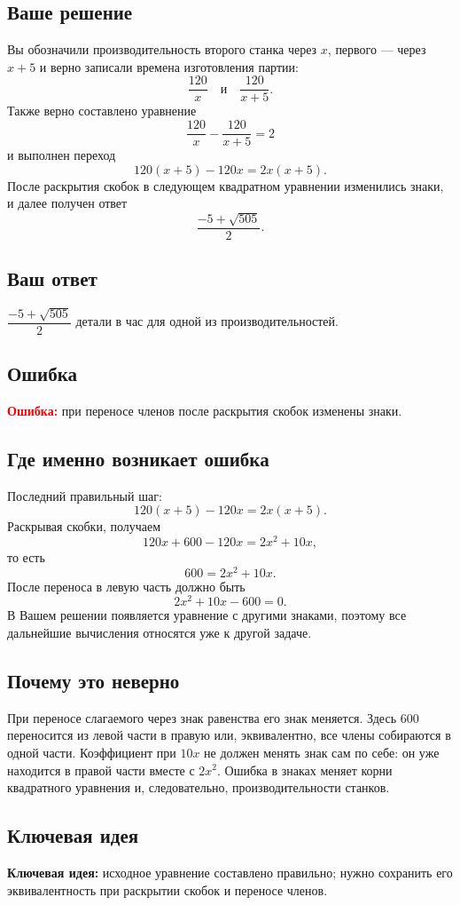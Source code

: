 \documentclass[12pt,a4paper]{article}
\newcommand{\err}{\textcolor{red}{\textbf{Ошибка:}}}
\newcommand{\idea}{\textcolor{blue!60!black}{\textbf{Ключевая идея:}}}
\begin{document}
\subsection*{Ваше решение}
Вы обозначили производительность второго станка через $x$, первого --- через $x+5$ и верно записали времена изготовления партии:
\[
\frac{120}{x}\quad\text{и}\quad\frac{120}{x+5}.
\]
Также верно составлено уравнение
\[
\frac{120}{x}-\frac{120}{x+5}=2
\]
и выполнен переход
\[
120(x+5)-120x=2x(x+5).
\]
После раскрытия скобок в следующем квадратном уравнении изменились знаки, и далее получен ответ
\[
\frac{-5+\sqrt{505}}{2}.
\]

\subsection*{Ваш ответ}
$\dfrac{-5+\sqrt{505}}{2}$ детали в час для одной из производительностей.

\subsection*{Ошибка}
\err{} при переносе членов после раскрытия скобок изменены знаки.

\subsection*{Где именно возникает ошибка}
Последний правильный шаг:
\[
120(x+5)-120x=2x(x+5).
\]
Раскрывая скобки, получаем
\[
120x+600-120x=2x^2+10x,
\]
то есть
\[
600=2x^2+10x.
\]
После переноса в левую часть должно быть
\[
2x^2+10x-600=0.
\]
В Вашем решении появляется уравнение с другими знаками, поэтому все дальнейшие вычисления относятся уже к другой задаче.

\subsection*{Почему это неверно}
При переносе слагаемого через знак равенства его знак меняется. Здесь $600$ переносится из левой части в правую или, эквивалентно, все члены собираются в одной части. Коэффициент при $10x$ не должен менять знак сам по себе: он уже находится в правой части вместе с $2x^2$. Ошибка в знаках меняет корни квадратного уравнения и, следовательно, производительности станков.

\subsection*{Ключевая идея}
\idea{} исходное уравнение составлено правильно; нужно сохранить его эквивалентность при раскрытии скобок и переносе членов.
\end{document}

